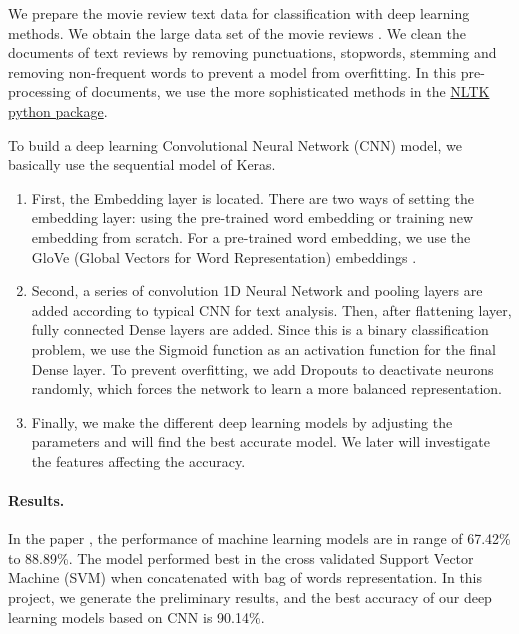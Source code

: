 \documentclass[11pt]{article}
\begin{document}
We prepare the movie review text data for classification with deep learning methods. We obtain the large data set of the movie reviews \cite{Stanford_movie_review_paper} \cite{Stanford_movie_review_dataset}. 
%
We clean the documents of text reviews by removing punctuations, stopwords, stemming and removing non-frequent words to prevent a model from overfitting. In this pre-processing of documents, we use the more sophisticated methods in the \href{https://www.nltk.org/}{NLTK python package}. 

To build a deep learning Convolutional Neural Network (CNN) model, we basically use the sequential model of Keras. 

\begin{enumerate}
	\item First, the Embedding layer is located. There are two ways of setting the embedding layer: using the pre-trained word embedding or training new embedding from scratch. For a pre-trained word embedding, we use the GloVe (Global Vectors for Word Representation) embeddings \cite{glove}.

\item Second, a series of convolution 1D Neural Network and pooling layers are added according to typical CNN for text analysis. Then, after flattening layer, fully connected Dense layers are added. Since this is a binary classification problem, we use the Sigmoid function as an activation function for the final Dense layer. To prevent overfitting, we add Dropouts to deactivate neurons randomly, which forces the network to learn a more balanced representation. 

\item Finally, we make the different deep learning models by adjusting the parameters and will find the best accurate model. We later will investigate the features affecting the accuracy.
\end{enumerate}

\paragraph*{Results.}
In the paper \cite{Stanford_movie_review_paper}, the performance of machine learning models are in range of 67.42\% to 88.89\%. The model performed best in the cross validated Support Vector Machine (SVM) when concatenated with bag of words representation. In this project, we generate the preliminary results, and the best accuracy of our deep learning models based on CNN is 90.14\%. 
\end{document}
